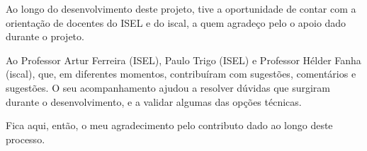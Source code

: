 




Ao longo do desenvolvimento deste projeto, tive a oportunidade de contar com a orientação de docentes do ISEL e do \gls{iscal}, a quem agradeço pelo o apoio dado durante o projeto. 

Ao Professor Artur Ferreira (ISEL), Paulo Trigo (ISEL) e  Professor Hélder Fanha (\gls{iscal}), que, em diferentes momentos, contribuíram com sugestões, comentários e sugestões. O seu acompanhamento ajudou a resolver dúvidas que surgiram durante o desenvolvimento, e a validar algumas das opções técnicas.

Fica aqui, então, o meu agradecimento pelo contributo dado ao longo deste processo.
